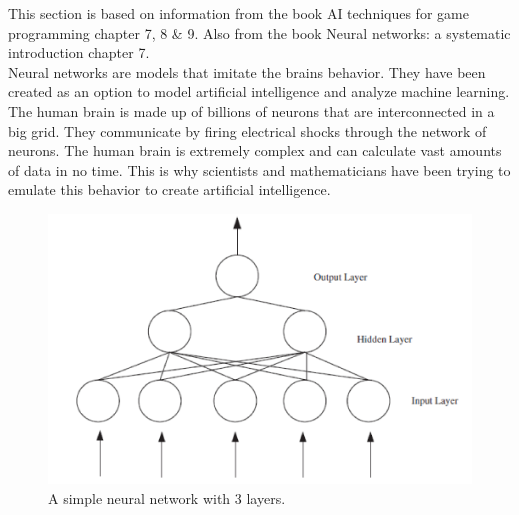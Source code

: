 This section is based on information from the book AI techniques for game programming\cite{buckland2002ai} chapter 7, 8 \& 9. Also from the book Neural networks: a systematic introduction\cite{rojas1996neural} chapter 7.
\\[0.5cm]
Neural networks are models that imitate the brains behavior. They have been created as an option to model artificial intelligence and analyze machine learning. The human brain is made up of billions of neurons that are interconnected in a big grid. They communicate by firing electrical shocks through the network of neurons. The human brain is extremely complex and can calculate vast amounts of data in no time. This is why scientists and mathematicians have been trying to emulate this behavior to create artificial intelligence.

\begin{figure}[h!]
\centering
\includegraphics[width=0.8\linewidth,natwidth=898,natheight=587]{billeder/ANN.png}
\caption{A simple neural network with 3 layers. \cite{stockForecasting}}
\label{fig:ANN}
\end{figure}

